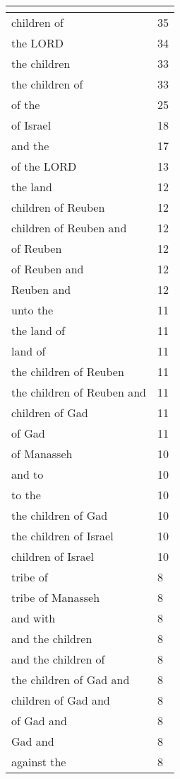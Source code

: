 \begin{center}
\begin{longtable}{|p{3.0in}|p{0.5in}|}
\hline \multicolumn{2}{c}{{ }} \\ \hline
\endfoot 
children of & 35\\ \hline 
the LORD & 34\\ \hline 
the children & 33\\ \hline 
the children of & 33\\ \hline 
of the & 25\\ \hline 
of Israel & 18\\ \hline 
and the & 17\\ \hline 
of the LORD & 13\\ \hline 
the land & 12\\ \hline 
children of Reuben & 12\\ \hline 
children of Reuben and & 12\\ \hline 
of Reuben & 12\\ \hline 
of Reuben and & 12\\ \hline 
Reuben and & 12\\ \hline 
unto the & 11\\ \hline 
the land of & 11\\ \hline 
land of & 11\\ \hline 
the children of Reuben & 11\\ \hline 
the children of Reuben and & 11\\ \hline 
children of Gad & 11\\ \hline 
of Gad & 11\\ \hline 
of Manasseh & 10\\ \hline 
and to & 10\\ \hline 
to the & 10\\ \hline 
the children of Gad & 10\\ \hline 
the children of Israel & 10\\ \hline 
children of Israel & 10\\ \hline 
tribe of & 8\\ \hline 
tribe of Manasseh & 8\\ \hline 
and with & 8\\ \hline 
and the children & 8\\ \hline 
and the children of & 8\\ \hline 
the children of Gad and & 8\\ \hline 
children of Gad and & 8\\ \hline 
of Gad and & 8\\ \hline 
Gad and & 8\\ \hline 
against the & 8\\ \hline 

\end{longtable}
\end{center}
